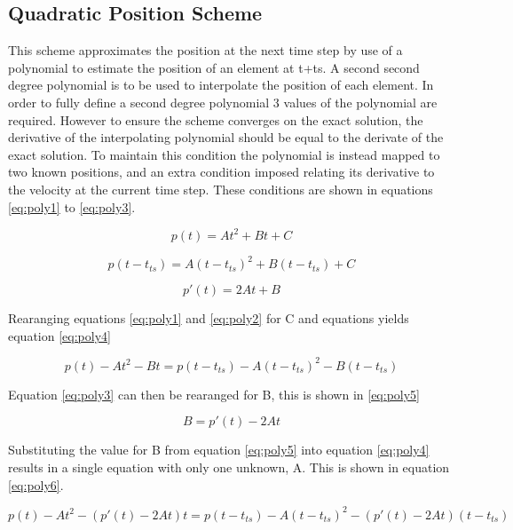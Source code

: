 \subsection{Quadratic Position Scheme}
This scheme approximates the position at the next time step by use of a polynomial to estimate the position of an element at t+ts. A second second degree polynomial is to be used to interpolate the position of each element. In order to fully define a second degree polynomial 3 values of the polynomial are required. However to ensure the scheme converges on the exact solution, the derivative of the interpolating polynomial should be equal to the derivate of the exact solution. To maintain this condition the polynomial is instead mapped to two known positions, and an extra condition imposed relating its derivative to the velocity at the current time step. These conditions are shown in equations \ref{eq:poly1} to \ref{eq:poly3}. 

\begin{equation}
\label{eq:poly1}
p(t)=At^2+Bt+C
\end{equation}

\begin{equation}
\label{eq:poly2}
p(t-t_{ts})=A(t-t_{ts})^2+B(t-t_{ts})+C
\end{equation}

\begin{equation}
\label{eq:poly3}
p'(t)=2At+B
\end{equation}

Rearanging equations \ref{eq:poly1} and \ref{eq:poly2} for C and equations yields equation \ref{eq:poly4}

\begin{equation}
\label{eq:poly4}
p(t)-At^2-Bt=p(t-t_{ts})-A(t-t_{ts})^2-B(t-t_{ts})
\end{equation}

Equation \ref{eq:poly3} can then be rearanged for B, this is shown in \ref{eq:poly5}

\begin{equation}
\label{eq:poly5}
B=p'(t)-2At
\end{equation}

Substituting the value for B from equation \ref{eq:poly5} into equation \ref{eq:poly4} results in a single equation with only one unknown, A. This is shown in equation \ref{eq:poly6}.

\begin{equation}
\label{eq:poly6}
p(t)-At^2-(p'(t)-2At)t=p(t-t_{ts})-A(t-t_{ts})^2-(p'(t)-2At)(t-t_{ts})
\end{equation}

